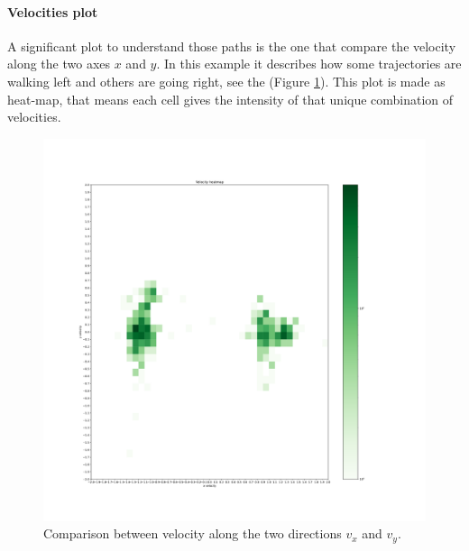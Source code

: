 \documentclass[class=article, crop=false]{standalone}
\begin{document}

\FloatBarrier

\paragraph{Velocities plot}
A significant plot to understand those paths is the one that compare the velocity along the two axes $x$ and $y$.
In this example it describes how some trajectories are walking left and others are going right, see the (Figure \ref{fig:5pids_velhist}).
This plot is made as heat-map, that means each cell gives the intensity of that unique combination of velocities.
\begin{figure}[h]
\centering
\includegraphics[scale=0.18]{fig/5pids/figure_trainf10_few_trajectories_Dx200_Dy100_VELHIST}
\captionsetup{width=.5\linewidth}
\caption{Comparison between velocity along the two directions $v_x$ and $v_y$.}
\label{fig:5pids_velhist}
\end{figure}
\end{document}
